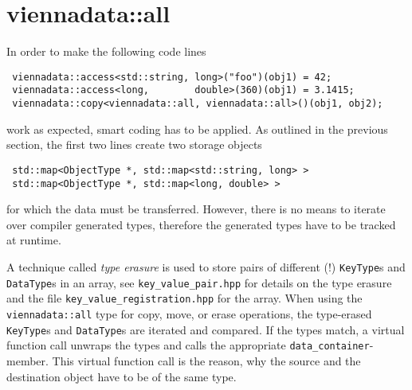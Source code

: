 \section{viennadata::all} \label{sec:viennadata-all}
In order to make the following code lines
\begin{lstlisting}
 viennadata::access<std::string, long>("foo")(obj1) = 42;
 viennadata::access<long,        double>(360)(obj1) = 3.1415;
 viennadata::copy<viennadata::all, viennadata::all>()(obj1, obj2);
\end{lstlisting}
work as expected, smart coding has to be applied. As outlined in the previous section, the first two lines create two storage objects
\begin{lstlisting}
 std::map<ObjectType *, std::map<std::string, long> >
 std::map<ObjectType *, std::map<long, double> >
\end{lstlisting}
for which the data must be transferred. However, there is no means to iterate over compiler generated types, therefore the generated types have to be tracked at runtime.

A technique called \emph{type erasure} \cite{Alexandrescu:ModernCpp} is used to store pairs of different (!) \lstinline|KeyType|s and \lstinline|DataType|s in an array, see \lstinline|key_value_pair.hpp| for details on the type erasure and the file \lstinline|key_value_registration.hpp| for the array. When using the \lstinline|viennadata::all| type for copy, move, or erase operations, the type-erased \lstinline|KeyType|s and \lstinline|DataType|s are iterated and compared. If the types match, a virtual function call unwraps the types and calls the appropriate \lstinline|data_container|-member. This virtual function call is the reason, why the source and the destination object have to be of the same type.

